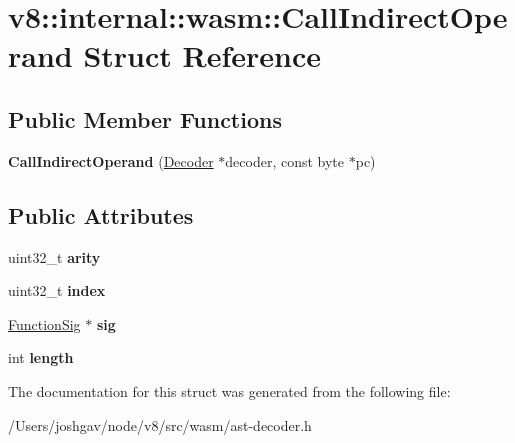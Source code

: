 \hypertarget{structv8_1_1internal_1_1wasm_1_1_call_indirect_operand}{}\section{v8\+:\+:internal\+:\+:wasm\+:\+:Call\+Indirect\+Operand Struct Reference}
\label{structv8_1_1internal_1_1wasm_1_1_call_indirect_operand}
\subsection*{Public Member Functions}
\begin{DoxyCompactItemize}
\item 
{\bfseries Call\+Indirect\+Operand} (\hyperlink{classv8_1_1internal_1_1wasm_1_1_decoder}{Decoder} $\ast$decoder, const byte $\ast$pc)\hypertarget{structv8_1_1internal_1_1wasm_1_1_call_indirect_operand_a9424af8ef1f47b76cb01ef774995b2ec}{}\label{structv8_1_1internal_1_1wasm_1_1_call_indirect_operand_a9424af8ef1f47b76cb01ef774995b2ec}

\end{DoxyCompactItemize}
\subsection*{Public Attributes}
\begin{DoxyCompactItemize}
\item 
uint32\+\_\+t {\bfseries arity}\hypertarget{structv8_1_1internal_1_1wasm_1_1_call_indirect_operand_a0fca369567ba9c69d41d7a72d2d6b478}{}\label{structv8_1_1internal_1_1wasm_1_1_call_indirect_operand_a0fca369567ba9c69d41d7a72d2d6b478}

\item 
uint32\+\_\+t {\bfseries index}\hypertarget{structv8_1_1internal_1_1wasm_1_1_call_indirect_operand_aa99646b7eedae915a336c1af4da92963}{}\label{structv8_1_1internal_1_1wasm_1_1_call_indirect_operand_aa99646b7eedae915a336c1af4da92963}

\item 
\hyperlink{classv8_1_1internal_1_1_signature}{Function\+Sig} $\ast$ {\bfseries sig}\hypertarget{structv8_1_1internal_1_1wasm_1_1_call_indirect_operand_a30536bbf79e4d9247a3eb9bc06a2c2d7}{}\label{structv8_1_1internal_1_1wasm_1_1_call_indirect_operand_a30536bbf79e4d9247a3eb9bc06a2c2d7}

\item 
int {\bfseries length}\hypertarget{structv8_1_1internal_1_1wasm_1_1_call_indirect_operand_abd471af423a0a2bc5470b93a52d2db5c}{}\label{structv8_1_1internal_1_1wasm_1_1_call_indirect_operand_abd471af423a0a2bc5470b93a52d2db5c}

\end{DoxyCompactItemize}


The documentation for this struct was generated from the following file\+:\begin{DoxyCompactItemize}
\item 
/\+Users/joshgav/node/v8/src/wasm/ast-\/decoder.\+h\end{DoxyCompactItemize}
